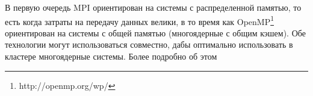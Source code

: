 В первую очередь MPI ориентирован на системы с распределенной памятью, то есть когда затраты на передачу данных велики, в то время как OpenMP\footnote{http://openmp.org/wp/} ориентирован на системы с общей памятью (многоядерные с общим кэшем). Обе технологии могут использоваться совместно, дабы оптимально использовать в кластере многоядерные системы. Более подробно об этом \cite{mpi:offsite}













